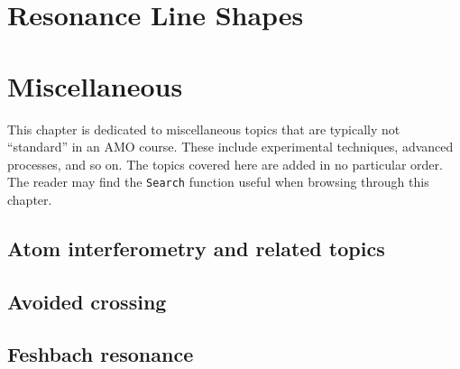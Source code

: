\documentclass{book}
\theoremstyle{definition}
\begin{document}



\chapter{Resonance Line Shapes}










\chapter{Miscellaneous}

This chapter is dedicated to miscellaneous topics that are typically not ``standard'' in an AMO course. These include experimental techniques, advanced processes, and so on. The topics covered here are added in no particular order. The reader may find the \texttt{Search} function useful when browsing through this chapter. 

\section{Atom interferometry and related topics}

\section{Avoided crossing}

\section{Feshbach resonance}











 




	
	
\end{document}
